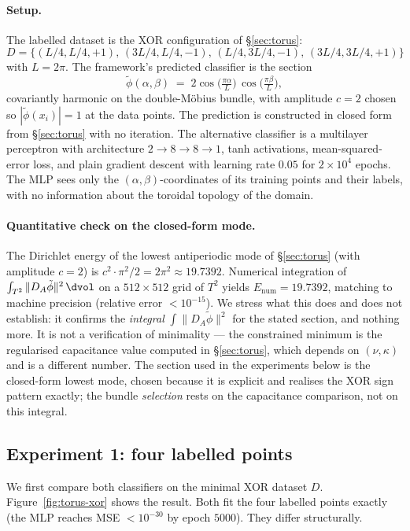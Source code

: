 \paragraph{Setup.} The labelled dataset is the XOR configuration of
\S\ref{sec:torus}:
\[
   D = \{(L/4,L/4,+1),\,(3L/4,L/4,-1),\,(L/4,3L/4,-1),\,(3L/4,3L/4,+1)\}
\]
with $L=2\pi$. The framework's predicted classifier is the section
\[
   \tilde\phi(\alpha,\beta) \;=\;
   2\cos\!\bigl(\tfrac{\pi\alpha}{L}\bigr)\,
   \cos\!\bigl(\tfrac{\pi\beta}{L}\bigr),
\]
covariantly harmonic on the double-M\"obius bundle, with amplitude
$c=2$ chosen so $|\tilde\phi(x_i)|=1$ at the data points. The
prediction is constructed in closed form from
\S\ref{sec:torus} with no iteration. The alternative classifier is
a multilayer perceptron with architecture $2\to 8\to 8\to 1$, tanh
activations, mean-squared-error loss, and plain gradient descent
with learning rate $0.05$ for $2\times 10^4$ epochs.
The MLP sees only the $(\alpha,\beta)$-coordinates of its training
points and their labels, with no information about the toroidal
topology of the domain.

\paragraph{Quantitative check on the closed-form mode.} The
Dirichlet energy of the lowest antiperiodic mode of
\S\ref{sec:torus} (with amplitude $c=2$) is
$c^2\cdot\pi^2/2=2\pi^2\approx 19.7392$. Numerical integration of
$\int_{T^2}\|D_A\tilde\phi\|^2\,\dvol$ on a $512\times 512$ grid of
$T^2$ yields $E_{\mathrm{num}}=19.7392$, matching to machine
precision (relative error $<10^{-15}$). We stress what this does and
does not establish: it confirms the \emph{integral} $\int\|D_A
\tilde\phi\|^2$ for the stated section, and nothing more. It is not
a verification of minimality --- the constrained minimum is the
regularised capacitance value computed in \S\ref{sec:torus}, which
depends on $(\nu,\kappa)$ and is a different number. The section
used in the experiments below is the closed-form lowest mode, chosen
because it is explicit and realises the XOR sign pattern exactly;
the bundle \emph{selection} rests on the capacitance comparison, not
on this integral.

\subsection{Experiment 1: four labelled points}
\label{ssec:experiment-1}

We first compare both classifiers on the minimal XOR dataset $D$.
Figure~\ref{fig:torus-xor} shows the result. Both fit the four
labelled points exactly (the MLP reaches MSE $<10^{-30}$ by epoch
$5000$). They differ structurally.

